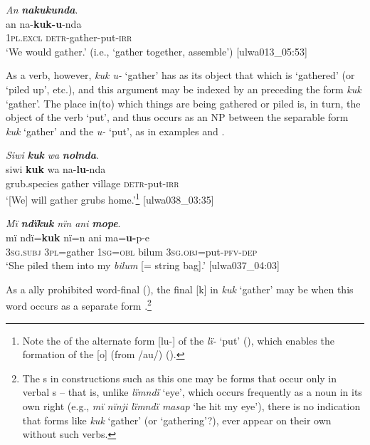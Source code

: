 \ea%
    \label{ex:phrase:80}
          \textit{An} \textbf{\textit{nakukunda}}.\\
\gll an      na-\textbf{kuk-u}-nda\\
    1\textsc{pl.excl}  \textsc{detr-}gather-put-\textsc{irr}\\
\glt `We would gather.’ (i.e., ‘gather together, assemble’) [ulwa013\_05:53]
\z

As a  verb, however, \textit{kuk u-} ‘gather’ has as its object that which is ‘gathered’ (or ‘piled up’, etc.), and this argument may be indexed by an  preceding the form \textit{kuk} ‘gather’. The place in(to) which things are being gathered or piled is, in turn, the object of the verb ‘put’, and thus occurs as an NP between the separable form \textit{kuk} ‘gather’ and the  \textit{u-} ‘put’, as in examples  and .


\ea%
    \label{ex:phrase:81}
          \textit{Siwi} \textbf{\textit{kuk}} \textit{wa} \textbf{\textit{nolnda}}.\\
\gll siwi    \textbf{kuk}  wa  na-\textbf{lu}{}-nda\\
    grub.species  gather  village  \textsc{detr}{}-put-\textsc{irr}\\
\glt `[We] will gather grubs home.’\footnote{Note the  of the alternate form [lu-] of the  \textit{lï-} ‘put’ (), which enables the formation of the   [o] (from /au/) ().} [ulwa038\_03:35]
\z

\ea%
    \label{ex:phrase:82}
          \textit{Mï} \textbf{\textit{ndïkuk}} \textit{nïn ani} \textbf{\textit{mope}}.\\
\gll mï      ndï=\textbf{kuk}    nï=n    ani    ma=\textbf{u-}p-e\\
    3\textsc{sg.subj}  3\textsc{pl}=gather  1\textsc{sg=obl}  bilum  3\textsc{sg.obj}=put-\textsc{pfv-dep}\\
\glt `She piled them into my \textit{bilum} [= string bag].’ [ulwa037\_04:03]
\z


As a ally prohibited word-final  (), the final [k] in \textit{kuk} ‘gather’ may be  when this word occurs as a separate form .\footnote{The s in  constructions such as this one may be forms that occur only in verbal s -- that is, unlike \textit{lïmndï} ‘eye’, which occurs frequently as a noun in its own right (e.g., \textit{mï nïnji lïmndï masap} ‘he hit my eye’), there is no indication that forms like \textit{kuk} ‘gather’ (or ‘gathering’?), ever appear on their own without such verbs.}

